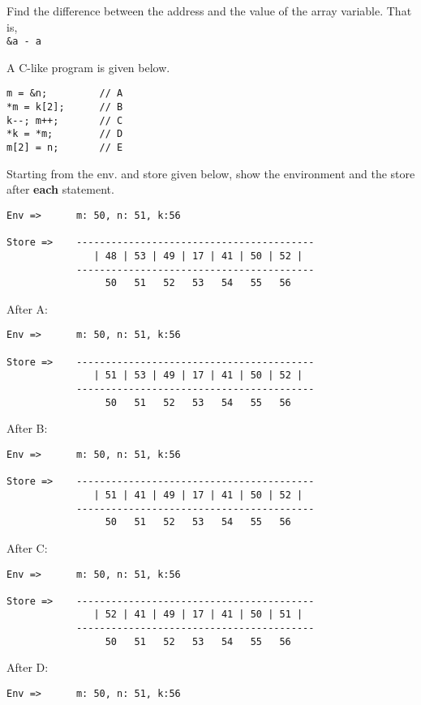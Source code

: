 \documentclass[addpoints]{exam}
\begin{document}
\begin{questions}
  \begin{solution}
  Find the difference between the address and the value
  of the array variable. That is,\\
  \texttt{\&a - a}
  \end{solution}

  \question
  A C-like program is given below.
  \begin{verbatim}
m = &n;         // A
*m = k[2];      // B
k--; m++;       // C
*k = *m;        // D
m[2] = n;       // E
  \end{verbatim}
  Starting from the env. and store given below,
  show the environment and the store 
  after \textbf{each} statement.
{\small
\begin{verbatim}
Env =>      m: 50, n: 51, k:56

Store =>    -----------------------------------------
               | 48 | 53 | 49 | 17 | 41 | 50 | 52 |  
            -----------------------------------------
                 50   51   52   53   54   55   56   
\end{verbatim}}


  \begin{solution}
After A:
{\small
\begin{verbatim}
Env =>      m: 50, n: 51, k:56

Store =>    -----------------------------------------
               | 51 | 53 | 49 | 17 | 41 | 50 | 52 |  
            -----------------------------------------
                 50   51   52   53   54   55   56   
\end{verbatim}}

After B:
{\small
\begin{verbatim}
Env =>      m: 50, n: 51, k:56

Store =>    -----------------------------------------
               | 51 | 41 | 49 | 17 | 41 | 50 | 52 |  
            -----------------------------------------
                 50   51   52   53   54   55   56   
\end{verbatim}}

After C:
{\small
\begin{verbatim}
Env =>      m: 50, n: 51, k:56

Store =>    -----------------------------------------
               | 52 | 41 | 49 | 17 | 41 | 50 | 51 |  
            -----------------------------------------
                 50   51   52   53   54   55   56   
\end{verbatim}}

After D:
{\small
\begin{verbatim}
Env =>      m: 50, n: 51, k:56


\end{verbatim}}
\end{solution}
\end{questions}
\end{document}

